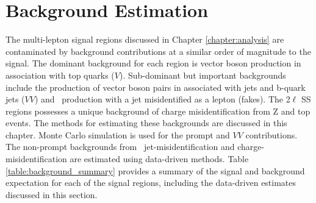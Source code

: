 \chapter[Background Estimation][Background Estimation]{Background Estimation}
\label{chapter:background}

The \tth multi-lepton signal regions discussed in Chapter \ref{chapter:analysis} are contaminated by background contributions at a similar order of magnitude to the signal. The dominant background for each region is vector boson production in association with top quarks (\ttbar$V$). Sub-dominant but important backgrounds include the production of vector boson pairs in associated with jets and b-quark jets ($VV$) and \ttbar\ production with a jet misidentified as a lepton (fakes). The 2$\ell$ SS regions possesses a unique background of charge misidentification from Z and top events. The methods for estimating these backgrounds are discussed in this chapter. Monte Carlo simulation is used for the prompt \ttV and $VV$ contributions. The non-prompt backgrounds from \ttbar\ jet-misidentification and charge-misidentification are estimated using data-driven methods. Table \ref{table:background_summary} provides a summary of the \tth signal and background expectation for each of the signal regions, including the data-driven estimates discussed in this section.


